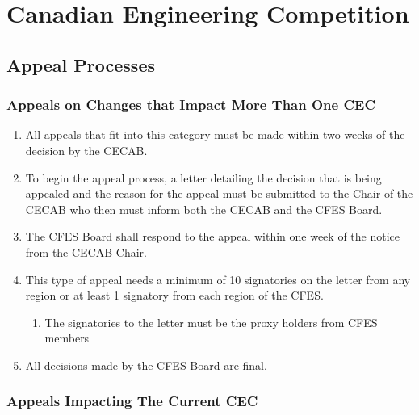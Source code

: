 \section{Canadian Engineering Competition}
\label{canadian-engineering-competition}

\subsection{Appeal Processes}
\label{appeal-processes}

\subsubsection{Appeals on Changes that Impact More Than One CEC}
\label{appeals-on-changes-that-impact-more-than-one-cec}

\begin{enumerate}
 \item
  All appeals that fit into this category must be made within two weeks of the decision by the CECAB.
 \item
  To begin the appeal process, a letter detailing the decision that is being appealed and the reason for the appeal must be submitted to the Chair of the CECAB who then must inform both the CECAB and the CFES Board.
 \item
  The CFES Board shall respond to the appeal within one week of the notice from the CECAB Chair.
 \item
  This type of appeal needs a minimum of 10 signatories on the letter from any region or at least 1 signatory from each region of the CFES.

  \begin{enumerate}
   \item
    The signatories to the letter must be the proxy holders from CFES members
  \end{enumerate}

 \item
  All decisions made by the CFES Board are final.
\end{enumerate}

\subsubsection{Appeals Impacting The Current CEC}
\label{appeals-impacting-the-current-cec}

